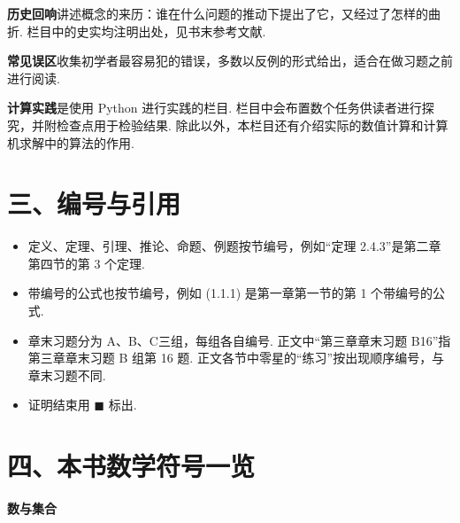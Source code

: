 \textbf{历史回响}讲述概念的来历：谁在什么问题的推动下提出了它，又经过了怎样的曲折. 栏目中的史实均注明出处，见书末参考文献. 

\textbf{常见误区}收集初学者最容易犯的错误，多数以反例的形式给出，适合在做习题之前进行阅读.

\textbf{计算实践}是使用 Python 进行实践的栏目. 栏目中会布置数个任务供读者进行探究，并附检查点用于检验结果. 除此以外，本栏目还有介绍实际的数值计算和计算机求解中的算法的作用.

\section*{三、编号与引用}
\begin{itemize}
	\item 定义、定理、引理、推论、命题、例题按节编号，例如“定理 2.4.3”是第二章第四节的第 3 个定理.
	\item 带编号的公式也按节编号，例如 (1.1.1) 是第一章第一节的第 1 个带编号的公式.
	\item 章末习题分为 A、B、C三组，每组各自编号. 正文中“第三章章末习题 B16”指第三章章末习题 B 组第 16 题. 正文各节中零星的“练习”按出现顺序编号，与章末习题不同.
	\item 证明结束用 $\blacksquare$ 标出.
\end{itemize}

\section*{四、本书数学符号一览}

\textbf{数与集合}

